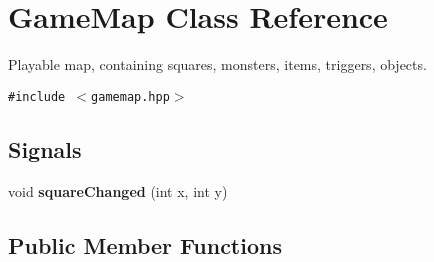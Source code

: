 \section{Game\-Map Class Reference}
\label{classGameMap}
Playable map, containing squares, monsters, items, triggers, objects.  


{\tt \#include $<$gamemap.hpp$>$}

\subsection*{Signals}
\begin{CompactItemize}
\item 
void {\bf square\-Changed} (int x, int y)
\end{CompactItemize}
\subsection*{Public Member Functions}
